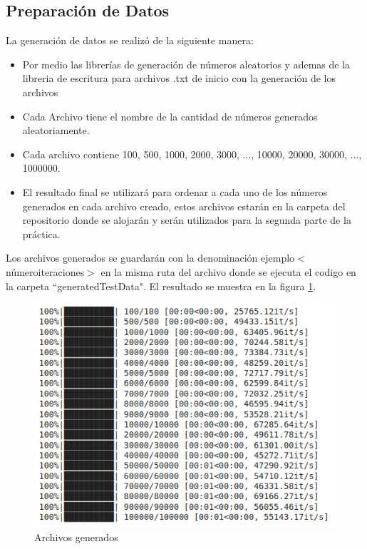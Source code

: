 \documentclass{article}
\begin{document}
		\subsection{Preparación de Datos}
		
    		La generación de datos se realizó de la siguiente manera:
    		\begin{itemize}
    		    \item Por medio las librerías de generación de números aleatorios y ademas de la libreria de escritura para archivos .txt de inicio con la generación de los archivos
    		    \item Cada Archivo tiene el nombre de la cantidad de números generados aleatoriamente.
    		    \item Cada archivo contiene 100, 500, 1000, 2000, 3000, ..., 10000, 20000, 30000, ..., 1000000.
    		    \item El resultado final se utilizará para ordenar a cada uno de los números generados en cada archivo creado, estos archivos estarán en la carpeta del repositorio donde se alojarán y serán utilizados para la segunda parte de la práctica.
    		\end{itemize}
    		
    		Los archivos generados se guardarán con la denominación ejemplo\textunderscore$<$número\textunderscore iteraciones$>$ en la misma ruta del archivo donde se ejecuta el codigo en la carpeta ``generatedTestData". El resultado se muestra en la figura \ref{fig:prep_datos_fig1}.
    		
    		
    		\begin{figure}[H]
				\centering
				\includegraphics[scale=0.40]{img/1_preparacion_datos.png}
				\caption{Archivos generados}
				\label{fig:prep_datos_fig1}
			\end{figure}
			
\end{document}
